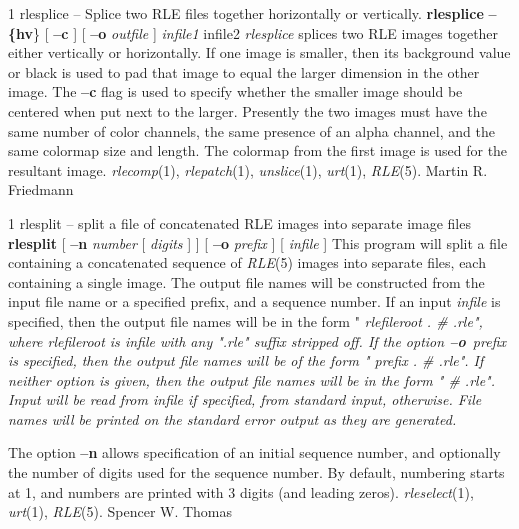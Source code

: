 %
%
%
 1
rlesplice -- Splice two RLE files together horizontally or vertically.
{\bf rlesplice}
{\bf --\{hv}\}
[
{\bf --c}
] [
{\bf --o}
{\it outfile}
] 
{\it infile1} infile2
{\it rlesplice}
splices two RLE images together either vertically or horizontally.  If one
image is smaller, then its background value or black is used to pad that image
to equal the larger dimension in the other image.  The 
{\bf --c}
flag is used to
specify whether the smaller image should be centered when put next to the
larger.  Presently the two images must have the same number of color channels,
the same presence of an alpha channel, and the same colormap size and length.
The colormap from the first image is used for the resultant image.
{\it rlecomp}{\rm (1),}
{\it rlepatch}{\rm (1),}
{\it unslice}{\rm (1),}
{\it urt}{\rm (1),}
{\it RLE}{\rm (5).}
Martin R. Friedmann
\newpage


%
%
%
 1
rlesplit -- split a file of concatenated RLE images into separate image files
{\bf rlesplit}
[
{\bf --n}
{\it number}
[ 
{\it digits}
] ] [
{\bf --o}
{\it prefix}
] [ 
{\it infile}
]
This program will split a file containing a concatenated sequence of
{\it RLE}{\rm (5)}
images into separate files, each containing a single image.  The
output file names will be constructed from the input file name or a
specified prefix, and a sequence number.  If an input
{\it infile}
is specified, then the output file names will be in the form
"%
\it rlefileroot\rm%
.%
\it \#\rm%
.rle",
where
{\it rlefileroot}
is 
{\it infile}
with any ".rle" suffix stripped off.  If the option
{\bf --o}{\it \ prefix}
is specified, then the output file names will be of the form
"%
\it prefix\rm%
.%
\it \#\rm%
.rle".
If neither option is given, then the output file names will be in the
form "%
\it \#\rm%
.rle".
Input will be read from
{\it infile}
if specified, from standard input, otherwise.  File names will be
printed on the standard error output as they are generated.

The option
{\bf --n}
allows specification of an initial sequence number, and optionally the
number of digits used for the sequence number.  By default, numbering
starts at 1, and numbers are printed with 3 digits (and leading zeros).
{\it rleselect}{\rm (1),}
{\it urt}{\rm (1),}
{\it RLE}{\rm (5).}
Spencer W. Thomas

